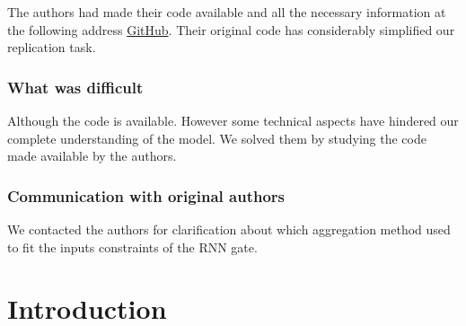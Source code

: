 The authors had made their code available and all the necessary information at the following  address \href{https://github.com/srijankr/jodie}{GitHub}. Their original code has considerably simplified our replication task.

\subsubsection{What was difficult}

Although the code is available. However some technical aspects have hindered our complete understanding of the model. We solved them by studying the code made available by the authors.

\subsubsection{Communication with original authors}
We contacted the authors for clarification about which aggregation method used to fit the inputs constraints of the RNN gate.

\newpage

\section*{Introduction}

